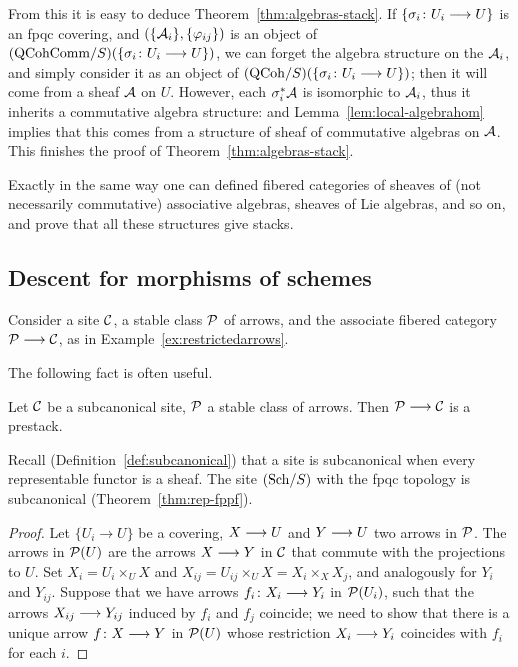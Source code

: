 \begin{4   STACKS}
\begin{4.2 Descent for quasi-coherent sheaves}
From this it is easy to deduce Theorem~\ref{thm:algebras-stack}. If $\{\sigma_{i}\colon U_{i} \arr U\}$ is an fpqc covering, and  $(\{\mathcal{A}_{i}\}, \{\varphi_{ij}\})$ is an object of $({\mathrm{QCohComm}/S})(\{\sigma_{i}\colon U_{i} \longrightarrow U\})$, we can forget the algebra structure on the $\mathcal{A}_{i}$, and simply consider it as an object of $({\mathrm{QCoh}/S})(\{\sigma_{i}\colon U_{i} \longrightarrow U\})$; then it will come from a \qc sheaf $\mathcal{A}$ on $U$. However, each $\sigma_{i}^{*}\mathcal{A}$ is isomorphic to $\mathcal{A}_{i}$, thus it inherits a commutative algebra structure: and Lemma~\ref{lem:local-algebrahom} implies that this comes from a structure of sheaf of commutative algebras on $\mathcal{A}$. This finishes the proof of Theorem~\ref{thm:algebras-stack}.

Exactly in the same way one can defined fibered categories of sheaves of (not necessarily commutative) associative algebras, sheaves of Lie algebras, and so on, and prove that all these structures give stacks.

\end{4.2 Descent for quasi-coherent sheaves}
\begin{4.3 Descent for morphisms of schemes}
\setcounter{section}{2}
\section{Descent for morphisms of schemes}
\label{sec:descent-morphisms}

Consider a site $\mathcal{C}$, a stable class $\mathcal{P}$ of arrows, and the associate fibered category  $\cP \arr \cC$, as in Example~\ref{ex:restrictedarrows}.

The following fact is often useful.

\begin{proposition}\label{prop:stable->prestack}
Let $\mathcal{C}$ be a subcanonical site, $\mathcal{P}$ a stable class of arrows. Then $\cP \arr \cC$ is a prestack.
\end{proposition}

Recall (Definition~\ref{def:subcanonical}) that a site is subcanonical when every representable functor is a sheaf. The site $({\mathrm{Sch}/S})$ with the fpqc topology is subcanonical (Theorem~\ref{thm:rep-fppf}).

\begin{proof}
Let $\{U_i \to U\}$ be a covering, $X \arr U$ and $Y \arr U$ two arrows in $\mathcal{P}$. The arrows in $\mathcal{P}(U)$ are the arrows $X \arr Y$ in $\mathcal{C}$ that commute with the projections to $U$. Set $X_i = U_i \times_U X$ and $X_{ij} = U_{ij}\times_U X = X_i \times_X X_j$, and analogously for $Y_i$ and $Y_{ij}$. Suppose that we have arrows $f_i \colon X_i \arr Y_i$ in $\mathcal{P}(U_i)$, such that the arrows $X_{ij} \arr Y_{ij}$ induced by $f_i$ and $f_j$ coincide; we need to show that there is a unique arrow $f \colon X \arr Y$ in $\mathcal{P}(U)$ whose restriction $X_i \arr Y_i$ coincides with $f_i$ for each $i$.


\end{proof}
\end{4.3 Descent for morphisms of schemes}
\end{4   STACKS}

